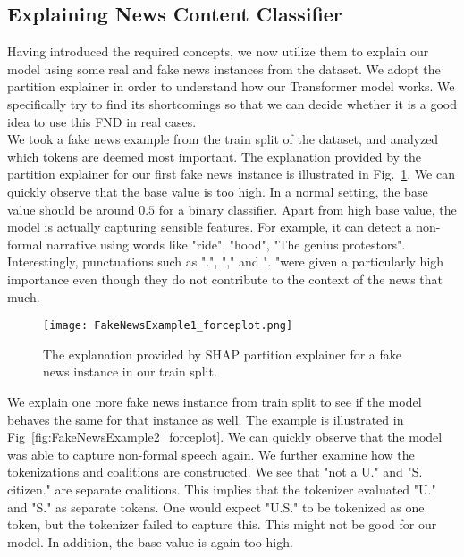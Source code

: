 \subsection{Explaining News Content Classifier}
\label{subsec:ExplainingNewsContentClassifier}
Having introduced the required concepts, we now utilize them to explain our model using some real and fake news instances from the dataset. We adopt the partition explainer in order to understand how our Transformer model works. We specifically try to find its shortcomings so that we can decide whether it is a good idea to use this FND in real cases.\\
We took a fake news example from the train split of the dataset, and analyzed which tokens are deemed most important. The explanation provided by the partition explainer for our first fake news instance is illustrated in Fig.~\ref{fig:FakeNewsExample1_forceplot}. We can quickly observe that the base value is too high. In a normal setting, the base value should be around $0.5$ for a binary classifier. Apart from high base value, the model is actually capturing sensible features. For example, it can detect a non-formal narrative using words like "ride", "hood", "The genius protestors".  Interestingly, punctuations such as ".", "," and ". "were given a particularly high importance even though they do not contribute to the context of the news that much.\\
\begin{figure}
    \centering
    \texttt{[image: FakeNewsExample1\_forceplot.png]}
    \caption[The explanation provided by SHAP partition explainer for a fake news instance in our train split.]{The explanation provided by SHAP partition explainer for a fake news instance in our train split.}
    \label{fig:FakeNewsExample1_forceplot}
\end{figure}
We explain one more fake news instance from train split to see if the model behaves the same for that instance as well. The example is illustrated in Fig~\ref{fig:FakeNewsExample2_forceplot}. We can quickly observe that the model was able to capture non-formal speech again. We further examine how the tokenizations and coalitions are constructed. We see that "not a U." and "S. citizen." are separate coalitions. This implies that the tokenizer evaluated "U." and "S." as separate tokens. One would expect "U.S." to be tokenized as one token, but the tokenizer failed to capture this. This might not be good for our model. In addition,  the base value is again too high.\\

